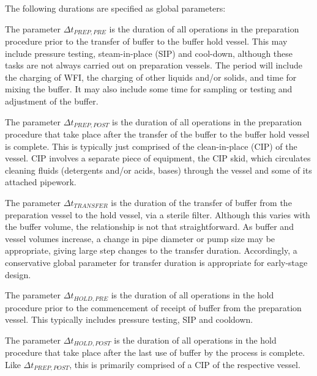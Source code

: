 The following durations are specified as global parameters:

The parameter $\Delta t_{\mathit{PREP,PRE}}$ is the duration of all operations
in the preparation procedure prior to the transfer of buffer to the buffer hold
vessel.  
This may include pressure testing, steam-in-place (SIP) and cool-down, although
these tasks are not always carried out on preparation vessels.
The period will include the charging of WFI, the charging of other liquids
and/or solids, and time for mixing the buffer.
It may also include some time for sampling or testing and adjustment of the
buffer.

The parameter $\Delta t_{\mathit{PREP,POST}}$ is the duration of all operations
in the preparation procedure that take place after the transfer of the buffer
to the buffer hold vessel is complete.
This is typically just comprised of the clean-in-place (CIP) of the vessel.
CIP involves a separate piece of equipment, the CIP skid, which circulates
cleaning fluids (detergents and/or acids, bases) through the vessel and some of
its attached pipework.

The parameter $\Delta t_{\mathit{TRANSFER}}$ is the duration of the transfer
of buffer from the preparation vessel to the hold vessel, via a sterile filter.
Although this varies with the buffer volume, the relationship is not that
straightforward.
As buffer and vessel volumes increase, a change in pipe diameter or pump size
may be appropriate, giving large step changes to the transfer duration.
Accordingly, a conservative global parameter for transfer duration is
appropriate for early-stage design.

The parameter $\Delta t_{\mathit{HOLD,PRE}}$ is the duration of all operations
in the hold procedure prior to the commencement of receipt of buffer from the
preparation vessel.
This typically includes pressure testing, SIP and cooldown.

The parameter $\Delta t_{\mathit{HOLD,POST}}$ is the duration of all operations
in the hold procedure that take place after the last use of buffer by the
process is complete.
Like $\Delta t_{\mathit{PREP,POST}}$, this is primarily comprised of a CIP of
the respective vessel.

